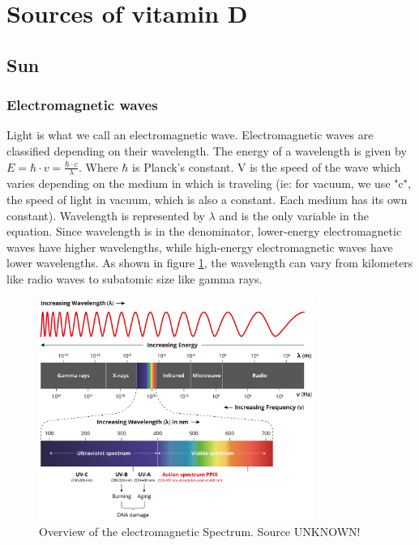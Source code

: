 \section{Sources of vitamin D}

\subsection{Sun}

\subsubsection{Electromagnetic waves}

Light is what we call an electromagnetic wave. Electromagnetic waves are classified depending on their wavelength. The energy of a wavelength is given by $E = \hbar \cdot v = \frac{\hbar \cdot c}{\lambda}$. Where $\hbar$ is Planck's constant. V is the speed of the wave which varies depending on the medium in which is traveling (ie: for vacuum, we use "c", the speed of light in vacuum, which is also a constant. Each medium has its own constant). Wavelength is represented by $\lambda$ and is the only variable in the equation. Since wavelength is in the denominator, lower-energy electromagnetic waves have higher wavelengths, while high-energy electromagnetic waves have lower wavelengths. As shown in figure \ref{fig:electroWaves}, the wavelength can vary from kilometers like radio waves to subatomic size like gamma rays.

\begin{figure}[H]
    
    \centering
    \includegraphics[width=0.8\textwidth]{figures/Vitamin D/Electromagnetic-Spectrum-FINAL.jpg}
    \caption{Overview of the electromagnetic Spectrum. Source UNKNOWN!}
    \label{fig:electroWaves}

\end{figure}

